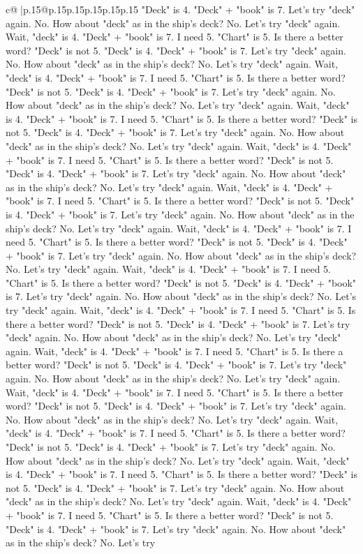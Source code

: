 \documentclass{article}
\begin{document}
{\begin{supertabular}{c@{$\;$}|p{.15\linewidth}@{}p{.15\linewidth}p{.15\linewidth}p{.15\linewidth}p{.15\linewidth}p{.15\linewidth}}
{{{"Deck" is 4. "Deck" + "book" is 7. Let's try "deck" again. No. How about "deck" as in the ship's deck? No. Let's try "deck" again. Wait, "deck" is 4. "Deck" + "book" is 7. I need 5. "Chart" is 5. Is there a better word? "Deck" is not 5. "Deck" is 4. "Deck" + "book" is 7. Let's try "deck" again. No. How about "deck" as in the ship's deck? No. Let's try "deck" again. Wait, "deck" is 4. "Deck" + "book" is 7. I need 5. "Chart" is 5. Is there a better word? "Deck" is not 5. "Deck" is 4. "Deck" + "book" is 7. Let's try "deck" again. No. How about "deck" as in the ship's deck? No. Let's try "deck" again. Wait, "deck" is 4. "Deck" + "book" is 7. I need 5. "Chart" is 5. Is there a better word? "Deck" is not 5. "Deck" is 4. "Deck" + "book" is 7. Let's try "deck" again. No. How about "deck" as in the ship's deck? No. Let's try "deck" again. Wait, "deck" is 4. "Deck" + "book" is 7. I need 5. "Chart" is 5. Is there a better word? "Deck" is not 5. "Deck" is 4. "Deck" + "book" is 7. Let's try "deck" again. No. How about "deck" as in the ship's deck? No. Let's try "deck" again. Wait, "deck" is 4. "Deck" + "book" is 7. I need 5. "Chart" is 5. Is there a better word? "Deck" is not 5. "Deck" is 4. "Deck" + "book" is 7. Let's try "deck" again. No. How about "deck" as in the ship's deck? No. Let's try "deck" again. Wait, "deck" is 4. "Deck" + "book" is 7. I need 5. "Chart" is 5. Is there a better word? "Deck" is not 5. "Deck" is 4. "Deck" + "book" is 7. Let's try "deck" again. No. How about "deck" as in the ship's deck? No. Let's try "deck" again. Wait, "deck" is 4. "Deck" + "book" is 7. I need 5. "Chart" is 5. Is there a better word? "Deck" is not 5. "Deck" is 4. "Deck" + "book" is 7. Let's try "deck" again. No. How about "deck" as in the ship's deck? No. Let's try "deck" again. Wait, "deck" is 4. "Deck" + "book" is 7. I need 5. "Chart" is 5. Is there a better word? "Deck" is not 5. "Deck" is 4. "Deck" + "book" is 7. Let's try "deck" again. No. How about "deck" as in the ship's deck? No. Let's try "deck" again. Wait, "deck" is 4. "Deck" + "book" is 7. I need 5. "Chart" is 5. Is there a better word? "Deck" is not 5. "Deck" is 4. "Deck" + "book" is 7. Let's try "deck" again. No. How about "deck" as in the ship's deck? No. Let's try "deck" again. Wait, "deck" is 4. "Deck" + "book" is 7. I need 5. "Chart" is 5. Is there a better word? "Deck" is not 5. "Deck" is 4. "Deck" + "book" is 7. Let's try "deck" again. No. How about "deck" as in the ship's deck? No. Let's try "deck" again. Wait, "deck" is 4. "Deck" + "book" is 7. I need 5. "Chart" is 5. Is there a better word? "Deck" is not 5. "Deck" is 4. "Deck" + "book" is 7. Let's try "deck" again. No. How about "deck" as in the ship's deck? No. Let's try "deck" again. Wait, "deck" is 4. "Deck" + "book" is 7. I need 5. "Chart" is 5. Is there a better word? "Deck" is not 5. "Deck" is 4. "Deck" + "book" is 7. Let's try "deck" again. No. How about "deck" as in the ship's deck? No. Let's try "deck" again. Wait, "deck" is 4. "Deck" + "book" is 7. I need 5. "Chart" is 5. Is there a better word? "Deck" is not 5. "Deck" is 4. "Deck" + "book" is 7. Let's try "deck" again. No. How about "deck" as in the ship's deck? No. Let's try }}}
\end{supertabular}}
\end{document}
